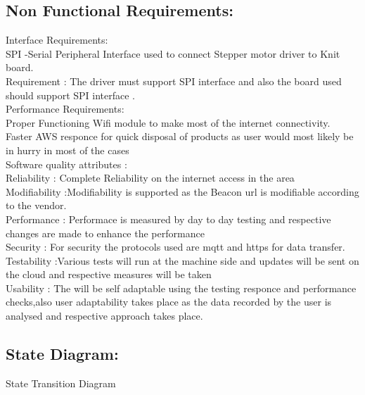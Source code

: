 \documentclass[oneside,a4paper,12pt]{report}
\begin{document}
\subsection{Non Functional Requirements:}
Interface Requirements:\\
SPI -Serial Peripheral Interface used to connect Stepper motor driver  to Knit board.\\
Requirement : The driver must support SPI interface and also the board used should support SPI interface .\\
Performance Requirements:\\
Proper Functioning Wifi module to make most of the internet connectivity.\\
Faster AWS responce for quick disposal of products as user would most likely be in hurry in most of the cases\\
Software quality attributes :\\
 Reliability : Complete Reliability on the internet access in the area \\
 Modifiability :Modifiability is supported as the Beacon url is modifiable according to the vendor. \\
 Performance : Performace is measured by day to day testing and respective changes are made to enhance the performance \\
 Security : For security the protocols used are mqtt and https for data transfer.\\
 Testability :Various tests will run at the machine side and updates will be sent on the cloud and respective measures will be taken  \\
 Usability : The will be self adaptable using the testing responce and performance checks,also user adaptability takes place as the data recorded by the user is analysed and respective approach takes place. \\

\subsection{State Diagram:}	
  State Transition Diagram\\
\end{document}
